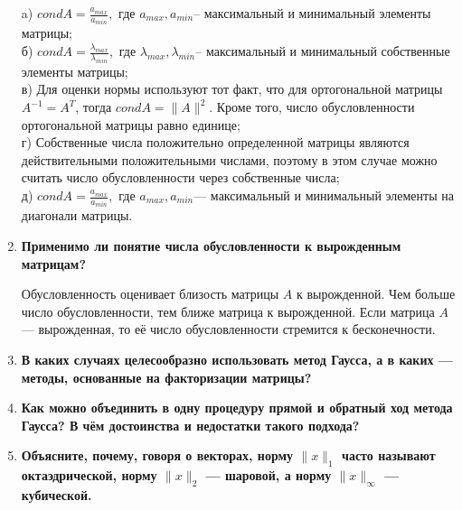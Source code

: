 \documentclass[12pt, a4paper]{article}
\begin{document}
\begin{enumerate}
a) $cond{A}=\frac{a_{max}}{a_{min}},$ где $a_{max},a_{min}$-- максимальный и минимальный элементы матрицы; \\
б) $cond{A}=\frac{\lambda_{max}}{\lambda_{min}},$ где $\lambda_{max},\lambda_{min}$-- максимальный и минимальный собственные элементы матрицы; \\
в) Для оценки нормы используют тот факт, что для ортогональной матрицы $A^{-1}=A^{T}$, тогда $cond{A}=\|A\|^2.$ Кроме того, число обусловленности ортогональной матрицы равно единице;\\
г) Собственные числа положительно определенной матрицы являются действительными положительными числами, поэтому в этом случае можно считать число обусловленности через собственные числа;\\
д) $cond{A}=\frac{a_{max}}{a_{min}},$ где $a_{max},a_{min}$--- максимальный и минимальный элементы на диагонали матрицы.


\item{\bf Применимо ли понятие числа обусловленности к вырожденным матрицам?}

Обусловленность оценивает близость матрицы $A$ к вырожденной. Чем больше число обусловленности, тем ближе матрица к вырожденной. Если матрица $A$ --- вырожденная, то её число обусловленности стремится к бесконечности.


\item{\bf В каких случаях целесообразно использовать метод Гаусса, а в каких --- методы, основанные на факторизации матрицы?}


\item{\bf Как можно объединить в одну процедуру прямой и обратный ход метода Гаусса? В чём достоинства и недостатки такого подхода?}


\item{\bf Объясните, почему, говоря о векторах, норму $\|x\|_{1}$ часто называют октаэдрической, норму $\|x\|_{2}$ --- шаровой, а норму $\|x\|_{\infty}$ --- кубической.}

\end{enumerate}
\newpage
\end{document}
